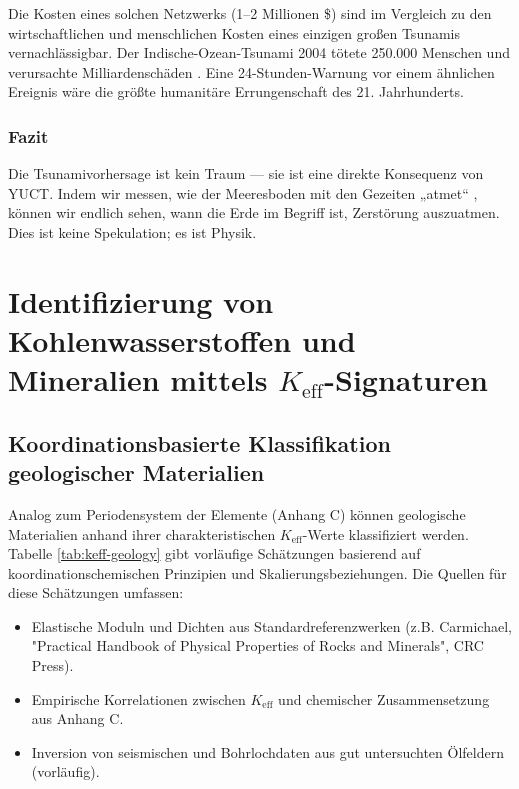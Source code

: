 \documentclass[12pt,a4paper]{article}
\theoremstyle{remark}
\newcommand{\Keff}{K_{\mathrm{eff}}}
\begin{document}
	Die Kosten eines solchen Netzwerks (1–2 Millionen \$) sind im Vergleich zu den wirtschaftlichen und menschlichen Kosten eines einzigen großen Tsunamis vernachlässigbar. Der Indische-Ozean-Tsunami 2004 tötete 250.000 Menschen und verursachte Milliardenschäden \cite{NOAA2024, USGS2024}. Eine 24-Stunden-Warnung vor einem ähnlichen Ereignis wäre die größte humanitäre Errungenschaft des 21. Jahrhunderts.
	
	\subsubsection{Fazit}
	
	Die Tsunamivorhersage ist kein Traum — sie ist eine direkte Konsequenz von YUCT. Indem wir messen, wie der Meeresboden mit den Gezeiten „atmet“ \cite{Tolstoy2013}, können wir endlich sehen, wann die Erde im Begriff ist, Zerstörung auszuatmen. Dies ist keine Spekulation; es ist Physik.
	
	\section{Identifizierung von Kohlenwasserstoffen und Mineralien mittels \(\Keff\)-Signaturen}
	\label{sec:identification}
	
	\subsection{Koordinationsbasierte Klassifikation geologischer Materialien}
	
	Analog zum Periodensystem der Elemente (Anhang C) können geologische Materialien anhand ihrer charakteristischen \(\Keff\)-Werte klassifiziert werden. Tabelle \ref{tab:keff-geology} gibt vorläufige Schätzungen basierend auf koordinationschemischen Prinzipien und Skalierungsbeziehungen. Die Quellen für diese Schätzungen umfassen:
	\begin{itemize}
		\item Elastische Moduln und Dichten aus Standardreferenzwerken (z.B. Carmichael, "Practical Handbook of Physical Properties of Rocks and Minerals", CRC Press).
		\item Empirische Korrelationen zwischen \(\Keff\) und chemischer Zusammensetzung aus Anhang C.
		\item Inversion von seismischen und Bohrlochdaten aus gut untersuchten Ölfeldern (vorläufig).
	\end{itemize}
	
\end{document}
